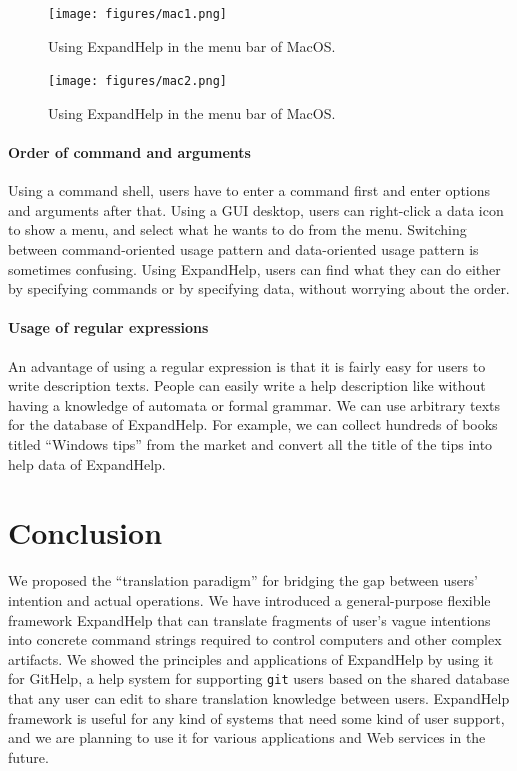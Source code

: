 \documentclass[manuscript,screen,review]{acmart}
\def\GH{\textsf{GitHelp}}
\def\GIT{\texttt{git}}
\def\EH{\textsf{ExpandHelp}}
\begin{document}
\begin{figure}[h]
  \centerline{\texttt{[image: figures/mac1.png]}}
  \caption{Using {\EH} in the menu bar of MacOS.}
  \label{mac1}
\end{figure}

\begin{figure}[h]
  \centerline{\texttt{[image: figures/mac2.png]}}
  \caption{Using {\EH} in the menu bar of MacOS.}
  \label{mac2}
\end{figure}

\paragraph{Order of command and arguments}

Using a command shell,
users have to enter a command first and enter options and arguments after that.
Using a GUI desktop,
users can right-click a data icon to show a menu,
and select what he wants to do from the menu.
Switching between command-oriented usage pattern and
data-oriented usage pattern is sometimes confusing.
Using {\EH}, users can find what they can do
either by specifying commands or by specifying data, 
without worrying about the order.

\paragraph{Usage of regular expressions}

An advantage of using a regular expression is that
it is fairly easy for users to write description texts.
People can easily write a help description like
without having a knowledge of automata or formal grammar.
We can use arbitrary texts for the database of {\EH}.
For example,
we can collect hundreds of books titled ``Windows tips'' from the market
and convert all the title of the tips into help data of {\EH}.

\section{Conclusion}

We proposed the ``translation paradigm'' for bridging the gap between
users' intention and actual operations.
%
We have introduced a general-purpose flexible framework {\EH}
that can translate fragments of user's vague intentions into
concrete command strings required to control computers and
other complex artifacts.
We showed the principles and applications of {\EH} by using it
for {\GH}, a help system for supporting {\GIT} users
based on the shared database that any user can edit to share
translation knowledge between users.
%
{\EH} framework is useful for any kind of systems that need
some kind of user support, and we are planning to use it
for various applications and Web services in the future.
\end{document}
